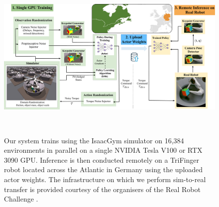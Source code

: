 \documentclass[letterpaper, 10 pt, conference]{ieeeconf}  %
\newcommand{\figref}[1]{Fig.~\ref{#1}}
\begin{document}
\begin{figure}[ht]
\begin{minipage}[c]{0.75\textwidth}
  \centering
  \includegraphics[width=\linewidth]{figure/system.pdf}
\end{minipage}
\,
\begin{minipage}[c]{0.23\textwidth}
  \caption{Our system trains using the IsaacGym simulator\protect\footnotemark \citep{makoviychuk2021isaac} on 16,384 environments in parallel on a single NVIDIA Tesla V100 or RTX 3090 GPU. Inference is then conducted remotely on a TriFinger robot located across the Atlantic in Germany using the uploaded actor weights. The infrastructure on which we perform sim-to-real transfer is provided courtesy of the organisers of the Real Robot Challenge \citep{real-robot-challenge}.} 
  \label{fig:trifinger}
  \end{minipage}
  \vspace*{10pt}
\end{figure}

\end{document}
